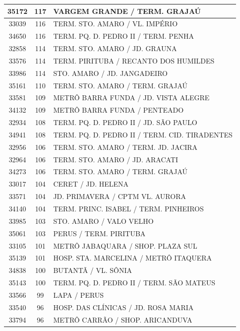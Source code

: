 \documentclass[
	12pt,				%
	oneside,			%
	a4paper,			%
	english,			%
	brazil				%
	]{abntex2ppgsi}
\begin{document}
\begin{apendicesenv}
\begin{longtable}{c|c|p{7cm}}
\hline
    35172 & 117   & VARGEM GRANDE / TERM. GRAJAÚ \\
\hline
    33039 & 116   & TERM. STO. AMARO / VL. IMPÉRIO \\
\hline
    34650 & 116   & TERM. PQ. D. PEDRO II / TERM. PENHA \\
\hline
    32858 & 114   & TERM. STO. AMARO / JD. GRAUNA \\
\hline
    33576 & 114   & TERM. PIRITUBA / RECANTO DOS HUMILDES \\
\hline
    33986 & 114   & STO. AMARO / JD. JANGADEIRO \\
\hline
    35161 & 110   & TERM. STO. AMARO / TERM. GRAJAÚ \\
\hline
    33581 & 109   & METRÔ BARRA FUNDA / JD. VISTA ALEGRE \\
\hline
    34132 & 109   & METRÔ BARRA FUNDA / PENTEADO \\
\hline
    32934 & 108   & TERM. PQ. D. PEDRO II / JD. SÃO PAULO \\
\hline
    34941 & 108   & TERM. PQ. D. PEDRO II / TERM. CID. TIRADENTES \\
\hline
    32956 & 106   & TERM. STO. AMARO / TERM. JD. JACIRA \\
\hline
    32964 & 106   & TERM. STO. AMARO / JD. ARACATI \\
\hline
    34273 & 106   & TERM. STO. AMARO / TERM. GRAJAÚ \\
\hline
    33017 & 104   & CERET / JD. HELENA \\
\hline
    33571 & 104   & JD. PRIMAVERA / CPTM VL. AURORA \\
\hline
    34140 & 104   & TERM. PRINC. ISABEL / TERM. PINHEIROS \\
\hline
    33985 & 103   & STO. AMARO / VALO VELHO \\
\hline
    35061 & 103   & PERUS / TERM. PIRITUBA \\
\hline
    33105 & 101   & METRÔ JABAQUARA / SHOP. PLAZA SUL \\
\hline
    35139 & 101   & HOSP. STA. MARCELINA / METRÔ ITAQUERA \\
\hline
    34838 & 100   & BUTANTÃ / VL. SÔNIA \\
\hline
    35143 & 100   & TERM. PQ. D. PEDRO II / TERM. SÃO MATEUS \\
\hline
    33566 & 99    & LAPA / PERUS \\
\hline
    33540 & 96    & HOSP. DAS CLÍNICAS / JD. ROSA MARIA \\
\hline
    33794 & 96    & METRÔ CARRÃO / SHOP. ARICANDUVA \\

\end{longtable}
\end{apendicesenv}
\end{document}
